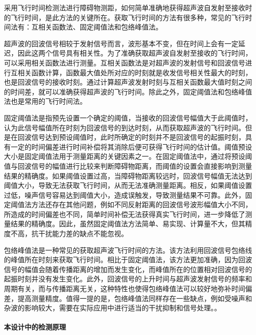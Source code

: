 	采用飞行时间检测法进行障碍物测距，如何简单准确地获得超声波自发射至接收时的飞行时间，是此方法的关键所在。获取飞行时间的方法有很多种，常见的飞行时间法有：互相关函数法、固定阈值法和包络峰值法。\par
	超声波的回波信号相较于发射信号而言，波形基本不变，但在时间上会有一定延迟，因此这两个信号具有相关性。为了准确获取超声波自发射至接收的飞行时间，可以采用相关函数法进行测量。互相关函数法是对超声波的发射信号和回波信号进行互相关函数计算，函数最大值处所对应的时刻就是收发信号相关性最大的时刻，也是回波信号的接收时刻。通过计算超声波发射时刻与互相关函数最大值时刻之间的时间差，就可以准确获得超声波的飞行时间。除此之外，固定阈值法和包络峰值法也是常用的飞行时间法。\par
	固定阈值法是指预先设置一个确定的阈值，当接收的回波信号幅值大于此阈值时，认为此信号幅值所在时刻为回波信号的到达时刻，从而获取超声波的飞行时间。但是在回波信号达到预设阈值时，此时所确定的时刻并不是回波信号的起振时刻，具有一定的时间偏差进行时间补偿将其消除后便可获得飞行时间的估计值。阈值预设大小是固定阈值法用于测量距离的关键因素之一。在固定阈值法中，通过将预设阈值与回波信号的幅值进行比较来判断障碍物距离，而阈值的设置会直接影响到测量结果的精确度。如果阈值设置过高，当障碍物距离较远时，回波信号幅值无法达到阈值大小，导致无法获取飞行时间，从而无法准确测量距离。相反，如果阈值设置过低，噪声信号容易达到阈值大小，造成误触发，导致测量结果不可靠。此外，固定阈值法方法还存在其他问题，例如不同反射距离的回波信号波形幅值大小不同，所造成的时间偏差也不同，简单时间补偿无法获得真实飞行时间，进一步降低了测量结果的精确度。因此，虽然固定阈值法方法简单、易实现、计算量不大，但其精度不高，抗干扰能力差的缺点不能忽视。\par
	包络峰值法是一种常见的获取超声波飞行时间的方法。该方法利用回波信号包络线的峰值所在时刻来获取飞行时间。相比于固定阈值法，该方法更加准确，因为回波信号的幅值会随着传播距离的增加而发生变化，而峰值所在的位置相对回波信号的起振时刻并没有发生变化。此外，回波信号的上升时间与超声波发射信号的频率和周期有关，而与传播距离无关，这种特性也使得包络峰值法可以较好地弥补时间偏差，提高测量精度。值得一提的是，包络峰值法同样存在一些缺点，例如受噪声和杂波的影响较大，需要在实际应用中进行适当的干扰抑制和信号处理。。
	\paragraph{本设计中的检测原理}
		
